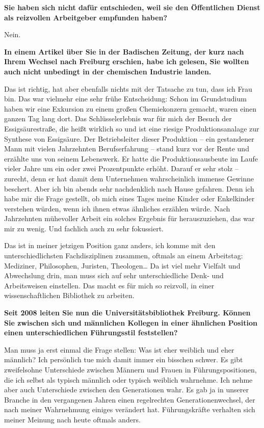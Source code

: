 \documentclass[a4paper,
fontsize=11pt,
oneside,
numbers=noperiodatend,
parskip=half-,
bibliography=totoc,
final
]{scrartcl}
\begin{document}
\textbf{Sie haben sich nicht dafür entschieden, weil sie den
Öffentlichen Dienst als reizvollen Arbeitgeber empfunden haben?}

Nein.~

\textbf{In einem Artikel über Sie in der Badischen Zeitung, der kurz
nach Ihrem Wechsel nach Freiburg erschien, habe ich gelesen, Sie wollten
auch nicht unbedingt in der chemischen Industrie landen.~}

Das ist richtig, hat aber ebenfalls nichts mit der Tatsache zu tun, dass
ich Frau bin. Das war vielmehr eine sehr frühe Entscheidung: Schon im
Grundstudium haben wir eine Exkursion zu einem großen Chemiekonzern
gemacht, waren einen ganzen Tag lang dort. Das Schlüsselerlebnis war für
mich der Besuch der Essigsäurestraße, die heißt wirklich so und ist eine
riesige Produktionsanalage zur Synthese von Essigsäure. Der
Betriebsleiter dieser Produktion -- ein gestandener Mann mit vielen
Jahrzehnten Berufserfahrung -- stand kurz vor der Rente und erzählte uns
von seinem Lebenswerk. Er hatte die Produktionsausbeute im Laufe vieler
Jahre um ein oder zwei Prozentpunkte erhöht. Darauf er sehr stolz --
zurecht, denn er hat damit dem Unternehmen wahrscheinlich immense
Gewinne beschert. Aber ich bin abends sehr nachdenklich nach Hause
gefahren. Denn ich habe mir die Frage gestellt, ob mich eines Tages
meine Kinder oder Enkelkinder verstehen würden, wenn ich ihnen etwas
ähnliches erzählen würde. Nach Jahrzehnten mühevoller Arbeit ein solches
Ergebnis für herauszuziehen, das war mir zu wenig. Und fachlich auch zu
sehr fokussiert.~

Das ist in meiner jetzigen Position ganz anders, ich komme mit den
unterschiedlichsten Fachdisziplinen zusammen, oftmals an einem
Arbeitstag: Mediziner, Philosophen, Juristen, Theologen\ldots{} Da ist
viel mehr Vielfalt und Abwechslung drin, man muss sich auf sehr
unterschiedliche Denk- und Arbeitsweisen einstellen. Das macht es für
mich so reizvoll, in einer wissenschaftlichen Bibliothek zu arbeiten.~

\textbf{Seit 2008 leiten Sie nun die Universitätsbibliothek Freiburg.
Können Sie zwischen sich und männlichen Kollegen in einer ähnlichen
Position einen unterschiedlichen Führungsstil feststellen?~}

Man muss ja erst einmal die Frage stellen: Was ist eher weiblich und
eher männlich? Ich persönlich tue mich damit immer ein bisschen schwer.
Es gibt zweifelsohne Unterschiede zwischen Männern und Frauen in
Führungspositionen, die ich selbst als typisch männlich oder typisch
weiblich wahrnehme. Ich nehme aber auch Unterschiede zwischen den
Generationen wahr. Es gab ja in unserer Branche in den vergangenen
Jahren einen regelrechten Generationenwechsel, der nach meiner
Wahrnehmung einiges verändert hat. Führungskräfte verhalten sich meiner
Meinung nach heute oftmals anders.~
\end{document}
